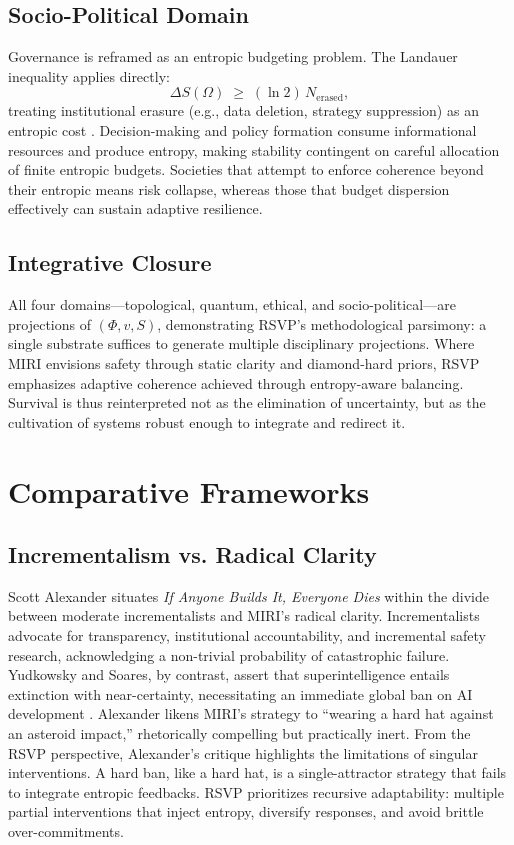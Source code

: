 \documentclass[12pt]{article}
\begin{document}
\subsection{Socio-Political Domain}
Governance is reframed as an entropic budgeting problem. The Landauer inequality applies directly:
\[
\Delta S(\Omega) \;\geq\; (\ln 2)\,N_{\mathrm{erased}},
\]
treating institutional erasure (e.g., data deletion, strategy suppression) as an entropic cost \citep{landauer1961irreversibility}. Decision-making and policy formation consume informational resources and produce entropy, making stability contingent on careful allocation of finite entropic budgets. Societies that attempt to enforce coherence beyond their entropic means risk collapse, whereas those that budget dispersion effectively can sustain adaptive resilience.

\subsection{Integrative Closure}
All four domains—topological, quantum, ethical, and socio-political—are projections of $(\Phi,v,S)$, demonstrating RSVP’s methodological parsimony: a single substrate suffices to generate multiple disciplinary projections. Where MIRI envisions safety through static clarity and diamond-hard priors, RSVP emphasizes adaptive coherence achieved through entropy-aware balancing. Survival is thus reinterpreted not as the elimination of uncertainty, but as the cultivation of systems robust enough to integrate and redirect it.

\section{Comparative Frameworks}
\subsection{Incrementalism vs. Radical Clarity}
Scott Alexander \citep{alexander2025reviewIABIED} situates \textit{If Anyone Builds It, Everyone Dies} within the divide between moderate incrementalists and MIRI’s radical clarity. Incrementalists advocate for transparency, institutional accountability, and incremental safety research, acknowledging a non-trivial probability of catastrophic failure. Yudkowsky and Soares, by contrast, assert that superintelligence entails extinction with near-certainty, necessitating an immediate global ban on AI development \citep{yudkowsky2025IABIED}. Alexander likens MIRI’s strategy to “wearing a hard hat against an asteroid impact,” rhetorically compelling but practically inert. From the RSVP perspective, Alexander’s critique highlights the limitations of singular interventions. A hard ban, like a hard hat, is a single-attractor strategy that fails to integrate entropic feedbacks. RSVP prioritizes recursive adaptability: multiple partial interventions that inject entropy, diversify responses, and avoid brittle over-commitments.
\end{document}
